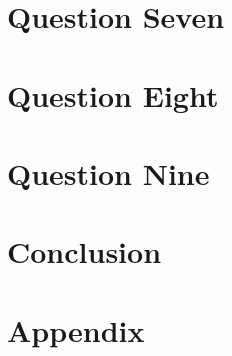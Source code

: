 \documentclass[12p,a4paper]{report}
\begin{document}
\chapter{Question Seven}


\chapter{Question Eight}


\chapter{Question Nine}


\chapter{Conclusion}


\chapter{Appendix}


\printbibliography
\end{document}
